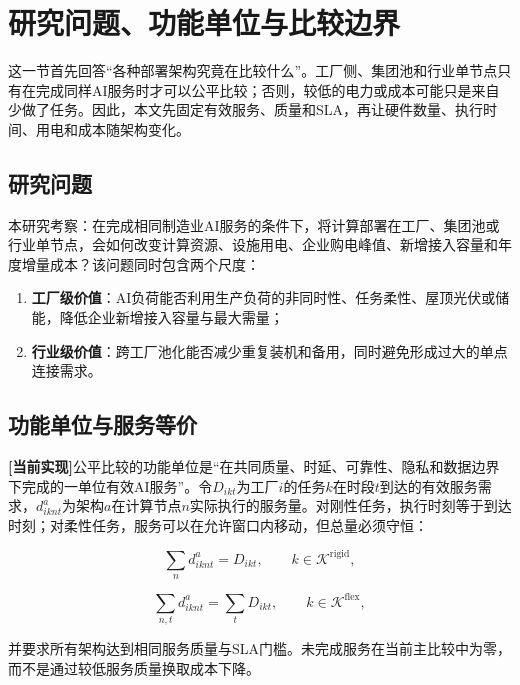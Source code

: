 \documentclass[preprint]{elsarticle}
\newcommand{\implemented}{\textcolor{green!40!black}{\textbf{[当前实现]}}}
\begin{document}
\section{研究问题、功能单位与比较边界}

这一节首先回答“各种部署架构究竟在比较什么”。工厂侧、集团池和行业单节点只有在完成同样AI服务时才可以公平比较；否则，较低的电力或成本可能只是来自少做了任务。因此，本文先固定有效服务、质量和SLA，再让硬件数量、执行时间、用电和成本随架构变化。

\subsection{研究问题}

本研究考察：在完成相同制造业AI服务的条件下，将计算部署在工厂、集团池或行业单节点，会如何改变计算资源、设施用电、企业购电峰值、新增接入容量和年度增量成本？该问题同时包含两个尺度：

\begin{enumerate}
  \item \textbf{工厂级价值}：AI负荷能否利用生产负荷的非同时性、任务柔性、屋顶光伏或储能，降低企业新增接入容量与最大需量；
  \item \textbf{行业级价值}：跨工厂池化能否减少重复装机和备用，同时避免形成过大的单点连接需求。
\end{enumerate}

\subsection{功能单位与服务等价}

\implemented 公平比较的功能单位是“在共同质量、时延、可靠性、隐私和数据边界下完成的一单位有效AI服务”。令$D_{ikt}$为工厂$i$的任务$k$在时段$t$到达的有效服务需求，$d^{a}_{iknt}$为架构$a$在计算节点$n$实际执行的服务量。对刚性任务，执行时刻等于到达时刻；对柔性任务，服务可以在允许窗口内移动，但总量必须守恒：

\begin{equation}
 \sum_n d^{a}_{iknt}=D_{ikt},\qquad k\in\mathcal K^{\mathrm{rigid}},
 \label{eq:rigid-service}
\end{equation}

\begin{equation}
 \sum_{n,t}d^{a}_{iknt}=\sum_tD_{ikt},\qquad k\in\mathcal K^{\mathrm{flex}},
 \label{eq:flex-service}
\end{equation}

并要求所有架构达到相同服务质量与SLA门槛。未完成服务在当前主比较中为零，而不是通过较低服务质量换取成本下降。
\end{document}
